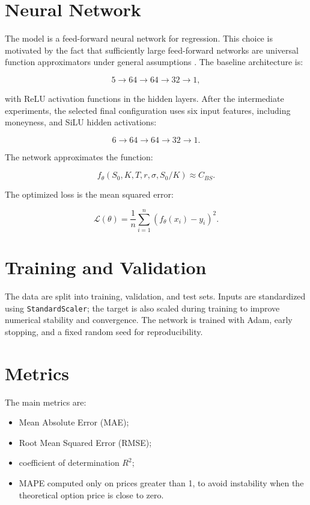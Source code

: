 \section{Neural Network}

The model is a feed-forward neural network for regression.
This choice is motivated by the fact that sufficiently large feed-forward networks are universal function approximators under general assumptions \cite{cybenko1989approximation,hornik1989multilayer}.
The baseline architecture is:

\begin{equation}
    5 \rightarrow 64 \rightarrow 64 \rightarrow 32 \rightarrow 1,
\end{equation}

with ReLU activation functions in the hidden layers.
After the intermediate experiments, the selected final configuration uses six input features, including moneyness, and SiLU hidden activations:

\begin{equation}
    6 \rightarrow 64 \rightarrow 64 \rightarrow 32 \rightarrow 1.
\end{equation}

The network approximates the function:

\begin{equation}
    f_\theta(S_0, K, T, r, \sigma, S_0/K) \approx C_{BS}.
\end{equation}

The optimized loss is the mean squared error:

\begin{equation}
    \mathcal{L}(\theta) =
    \frac{1}{n}
    \sum_{i=1}^{n}
    \left(f_\theta(x_i) - y_i\right)^2.
\end{equation}

\section{Training and Validation}

The data are split into training, validation, and test sets.
Inputs are standardized using \texttt{StandardScaler}; the target is also scaled during training to improve numerical stability and convergence.
The network is trained with Adam, early stopping, and a fixed random seed for reproducibility.

\section{Metrics}

The main metrics are:

\begin{itemize}
    \item Mean Absolute Error (MAE);
    \item Root Mean Squared Error (RMSE);
    \item coefficient of determination $R^2$;
    \item MAPE computed only on prices greater than 1, to avoid instability when the theoretical option price is close to zero.
\end{itemize}
